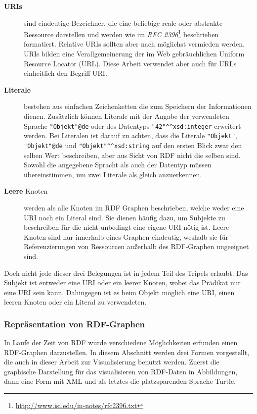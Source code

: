\begin{description}
    \item[\textbf{URIs}] sind eindeutige Bezeichner, die eine beliebige reale oder abstrakte Ressource darstellen und werden wie im \emph{RFC 2396}\footnote{\url{http://www.isi.edu/in-notes/rfc2396.txt}} beschrieben formatiert. Relative URIs sollten aber nach \cite{Klyne2004} möglichst vermieden werden. URIs bilden eine Verallgemeinerung der im Web gebräuchlichen Uniform Resource Locator (URL). Diese Arbeit verwendet aber auch für URLs einheitlich den Begriff URI.
   
    \item[\textbf{Literale}] bestehen aus einfachen Zeichenketten die zum Speichern der Informationen dienen. Zusätzlich können Literale mit der Angabe der verwendeten Sprache \texttt{"{}Objekt"{}@de} oder des Datentyps \texttt{"{}42"{}\^{}\^{}xsd:integer} erweitert werden. Bei Literalen ist darauf zu achten, dass die Literale \texttt{"{}Objekt"{}}, \texttt{"{}Objekt"{}@de} und \texttt{"{}Objekt"{}\^{}\^{}xsd:string} auf den ersten Blick zwar den selben Wert beschreiben, aber aus Sicht von RDF nicht die selben sind. Sowohl die angegebene Spracht als auch der Datentyp müssen übereinstimmen, um zwei Literale als gleich anzuerkennen.

    \item[\textbf{Leere} Knoten] werden als alle Knoten im RDF Graphen beschrieben, welche weder eine URI noch ein Literal sind. Sie dienen häufig dazu, um Subjekte zu beschreiben für die nicht unbedingt eine eigene URI nötig ist. Leere Knoten sind nur innerhalb eines Graphen eindeutig, weshalb sie für Referenzierungen von Ressourcen außerhalb des RDF-Graphen ungeeignet sind.
\end{description}

Doch nicht jede dieser drei Belegungen ist in jedem Teil des Tripels erlaubt. Das Subjekt ist entweder eine URI oder ein leerer Knoten, wobei das Prädikat nur eine URI sein kann. Dahingegen ist es beim Objekt möglich eine URI, einen leeren Knoten oder ein Literal zu verwendeten. 


\subsubsection{Repräsentation von RDF-Graphen} %
\label{ssub:darstellung_von_rdf_graphen}

In Laufe der Zeit von RDF wurde verschiedene Möglichkeiten erfunden einen RDF-Graphen darzustellen. In diesem Abschnitt werden drei Formen vorgestellt, die auch in dieser Arbeit zur Visualisierung benutzt werden. Zuerst die graphische Darstellung für das visualisieren von RDF-Daten in Abbildungen, dann eine Form mit XML und als letztes die platzsparenden Sprache Turtle.

